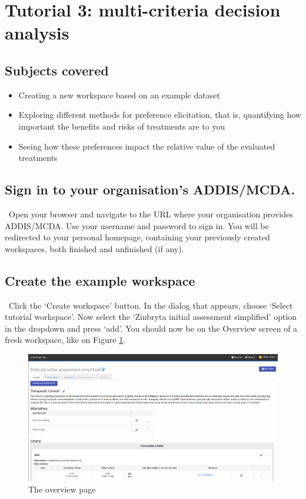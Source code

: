 \documentclass[00_mcda_tutorial.tex]{subfiles}
\begin{document}
\section*{Tutorial 3: multi-criteria decision analysis}
\addtocounter{section}{1}

\subsection*{Subjects covered}
\begin{itemize}
  \item Creating a new workspace based on an example dataset
  \item Exploring different methods for preference elicitation, that is, quantifying how important the benefits and risks of treatments are to you
  \item Seeing how these preferences impact the relative value of the evaluated treatments
\end{itemize}


\subsection*{Sign in to your organisation's ADDIS/MCDA.}
\leftpointright \, Open your browser and navigate to the URL where your organisation provides ADDIS/MCDA.
Use your username and password to sign in.
You will be redirected to your personal homepage, containing your previously created workspaces, both finished and unfinished (if any).

\subsection*{Create the example workspace}
\leftpointright \, Click the ‘Create workspace’ button. In the dialog that appears, choose ‘Select tutorial workspace’. Now select the ‘Zinbryta initial assessment simplified’ option in the dropdown and press ‘add’. You should now be on the Overview screen of a fresh workspace, like on Figure \ref{fig:overview_page}.
\newline

\begin{figure}[!h]
  \centering
  \includegraphics[width=\textwidth]{fig/overviewPage.png}
  \caption{The overview page}
  \label{fig:overview_page}
\end{figure}
\end{document}
